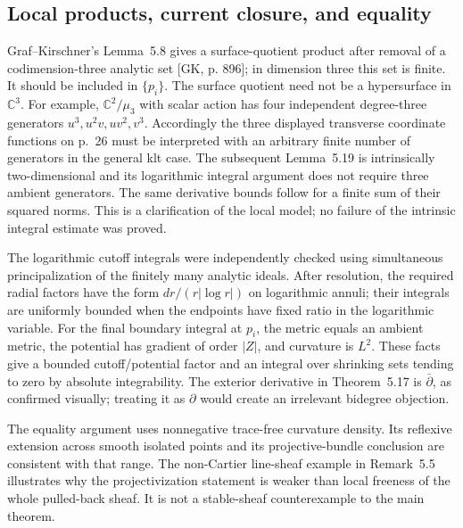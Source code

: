 \documentclass[10pt]{article}
\begin{document}
\subsection*{Local products, current closure, and equality}
Graf–Kirschner’s Lemma 5.8 gives a surface-quotient product after removal of a codimension-three analytic set [GK, p. 896]; in dimension three this set is finite. It should be included in \(\{p_i\}\). The surface quotient need not be a hypersurface in \(\mathbb C^3\). For example, \(\mathbb C^2/\mu_3\) with scalar action has four independent degree-three generators \(u^3,u^2v,uv^2,v^3\). Accordingly the three displayed transverse coordinate functions on p. 26 must be interpreted with an arbitrary finite number of generators in the general klt case. The subsequent Lemma 5.19 is intrinsically two-dimensional and its logarithmic integral argument does not require three ambient generators. The same derivative bounds follow for a finite sum of their squared norms. This is a clarification of the local model; no failure of the intrinsic integral estimate was proved.\par
The logarithmic cutoff integrals were independently checked using simultaneous principalization of the finitely many analytic ideals. After resolution, the required radial factors have the form \(dr/(r|\log r|)\) on logarithmic annuli; their integrals are uniformly bounded when the endpoints have fixed ratio in the logarithmic variable. For the final boundary integral at \(p_i\), the metric equals an ambient metric, the potential has gradient of order \(|Z|\), and curvature is \(L^2\). These facts give a bounded cutoff/potential factor and an integral over shrinking sets tending to zero by absolute integrability. The exterior derivative in Theorem 5.17 is \(\bar\partial\), as confirmed visually; treating it as \(\partial\) would create an irrelevant bidegree objection.\par
The equality argument uses nonnegative trace-free curvature density. Its reflexive extension across smooth isolated points and its projective-bundle conclusion are consistent with that range. The non-Cartier line-sheaf example in Remark 5.5 illustrates why the projectivization statement is weaker than local freeness of the whole pulled-back sheaf. It is not a stable-sheaf counterexample to the main theorem.\par
\end{document}
